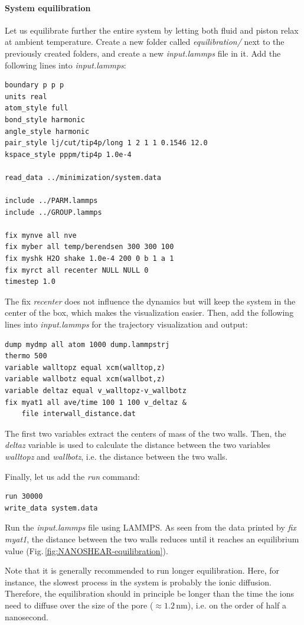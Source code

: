 \documentclass[9pt,tutorial]{livecoms}
\begin{document}
\paragraph{System equilibration}
Let us equilibrate further the entire system by letting both fluid and piston relax at ambient temperature. Create a new folder called \textit{equilibration/} next to the previously created folders, and create a new \textit{input.lammps} file in it. Add the following lines into \textit{input.lammps}:
{\normalsize \begin{verbatim}
boundary p p p
units real
atom_style full
bond_style harmonic
angle_style harmonic
pair_style lj/cut/tip4p/long 1 2 1 1 0.1546 12.0
kspace_style pppm/tip4p 1.0e-4

read_data ../minimization/system.data

include ../PARM.lammps
include ../GROUP.lammps

fix mynve all nve
fix myber all temp/berendsen 300 300 100
fix myshk H2O shake 1.0e-4 200 0 b 1 a 1
fix myrct all recenter NULL NULL 0
timestep 1.0
\end{verbatim}}
The fix \textit{recenter} does not influence the dynamics but will keep the system in the center of the box, which makes the
visualization easier. Then, add the following lines into \textit{input.lammps} for the trajectory visualization and output:
{\normalsize \begin{verbatim}
dump mydmp all atom 1000 dump.lammpstrj
thermo 500
variable walltopz equal xcm(walltop,z)
variable wallbotz equal xcm(wallbot,z)
variable deltaz equal v_walltopz-v_wallbotz
fix myat1 all ave/time 100 1 100 v_deltaz &
    file interwall_distance.dat
\end{verbatim}}
The first two variables extract the centers of mass of the two walls. Then, the \textit{deltaz} variable is used to calculate the distance between the two variables \textit{walltopz} and \textit{wallbotz}, i.e. the distance between the two walls.

Finally, let us add the \textit{run} command: 
{\normalsize \begin{verbatim}
run 30000
write_data system.data  
\end{verbatim}}
Run the \textit{input.lammps} file using LAMMPS. As seen from the data printed by \textit{fix myat1}, the distance between the two walls reduces until it reaches an equilibrium value (Fig.\,\ref{fig:NANOSHEAR-equilibration}).

Note that it is generally recommended to run longer equilibration. Here, for instance, the slowest process in the system is probably the ionic diffusion. Therefore, the equilibration should in principle be longer than the time
the ions need to diffuse over the size of the pore ($\approx 1.2\,\text{nm}$), i.e. on the order of half a nanosecond.
\end{document}
